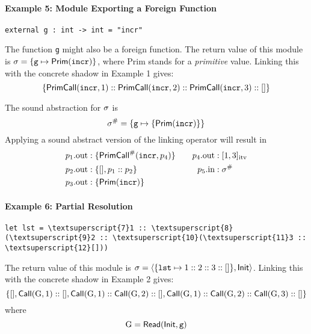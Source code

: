 \documentclass{article}
\begin{document}
\paragraph{Example 5: Module Exporting a Foreign Function}
\begin{center}
  \begin{BVerbatim}
external g : int -> int = "incr"
  \end{BVerbatim}
\end{center}
The function \texttt{g} might also be a foreign function.
The return value of this module is
$\sigma=\{\texttt{g}\mapsto\textsf{Prim}(\texttt{incr})\}$,
where \textsf{Prim} stands for a \emph{primitive} value.
Linking this with the concrete shadow in Example 1 gives:
\[\{\textsf{PrimCall}(\texttt{incr},1)::\textsf{PrimCall}(\texttt{incr},2)::\textsf{PrimCall}(\texttt{incr},3)::[]\}\]

The sound abstraction for $\sigma$ is
\[
  {\sigma}^{\#}=\{\texttt{g}\mapsto\{\textsf{Prim}(\texttt{incr})\}\}
\]
Applying a sound abstract version of the linking operator will result in
\begin{align*}
  p_1.\text{out} & :\{{\textsf{PrimCall}}^{\#}(\texttt{incr},p_4)\} &  &  & p_4.\text{out} & :[1,3]_{\text{itv}} \\
  p_2.\text{out} & :\{[],p_1:: p_2\}                      &  &  & p_5.\text{in}  & :{\sigma}^{\#}           \\
  p_3.\text{out} & :\{\textsf{Prim}(\texttt{incr})\}
\end{align*}

\paragraph{Example 6: Partial Resolution}
\begin{center}
  \begin{BVerbatim}[commandchars=\\\{\}]
let lst = \textsuperscript{7}1 :: \textsuperscript{8}(\textsuperscript{9}2 :: \textsuperscript{10}(\textsuperscript{11}3 :: \textsuperscript{12}[]))
  \end{BVerbatim}
\end{center}
The return value of this module is
$\sigma=\langle\{\texttt{lst}\mapsto 1::2::3::[]\},\mathsf{Init}\rangle$.
Linking this with the concrete shadow in Example 2 gives:
\[
  \{[],\mathsf{Call}(\text{G},1)::[],\mathsf{Call}(\text{G},1)::\mathsf{Call}(\text{G},2)::[],
  \mathsf{Call}(\text{G},1)::\mathsf{Call}(\text{G},2)::\mathsf{Call}(\text{G},3)::[]\}
\]
where
\[
  \text{G}=\mathsf{Read}(\mathsf{Init},\texttt{g})
\]
\end{document}
